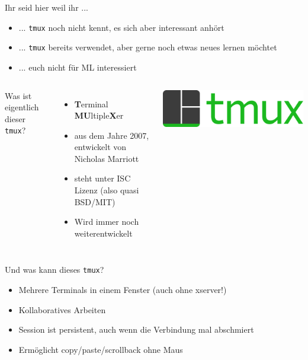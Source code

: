 \documentclass[plain]{beamer}
\title{\huge \tmux{}}
\author{Max Schik}
\newcommand{\tmux}{\texttt{tmux}}
\begin{document}
\begin{frame}
  \titlepage
\end{frame}

\begin{frame}
  Ihr seid hier weil ihr ...
  \begin{itemize}
    \item ... \tmux{} noch nicht kennt, es sich aber interessant anhört
    \item ... \tmux{} bereits verwendet, aber gerne noch etwas neues lernen möchtet
    \item ... euch nicht für ML interessiert
  \end{itemize}
\end{frame}

\begin{frame}
  \begin{columns}[onlytextwidth,T]
    \column{\dimexpr\linewidth-30mm-5mm}
    Was ist eigentlich dieser \tmux{}?
    \begin{itemize}
      \item \textbf{T}erminal \textbf{MU}ltiple\textbf{X}er
      \item aus dem Jahre 2007, entwickelt von Nicholas Marriott
      \item steht unter ISC Lizenz (also quasi BSD/MIT)
      \item Wird immer noch weiterentwickelt
    \end{itemize}
    \column{30mm}
    \includegraphics[width=\textwidth]{imgs/Tmux_logo.png}
  \end{columns}
\end{frame}

\begin{frame}
  Und was kann dieses \tmux{}?
  \begin{itemize}
    \item Mehrere Terminals in einem Fenster (auch ohne xserver!)
    \item Kollaboratives Arbeiten
    \item Session ist persistent, auch wenn die Verbindung mal abschmiert
    \item Ermöglicht copy/paste/scrollback ohne Maus
  \end{itemize}
\end{frame}
\end{document}
